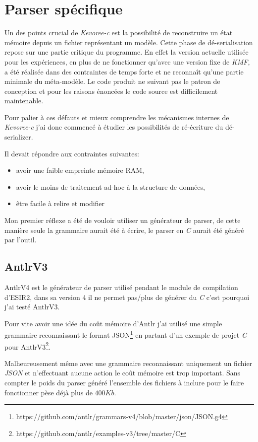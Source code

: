 \section{\label{parser-spécif}Parser spécifique}

Un des points crucial de \emph{Kevoree-c} est la possibilité de reconstruire un état mémoire depuis un fichier représentant un modèle. Cette phase de dé-serialisation repose sur une partie critique du programme. En effet la version actuelle utilisée pour les expériences, en plus de ne fonctionner qu'avec une version fixe de \emph{KMF}, a été réalisée dans des contraintes de temps forte et ne reconnaît qu'une partie minimale du méta-modèle.
Le code produit ne suivant pas le patron de conception et pour les raisons énoncées le code source est difficilement maintenable.

Pour palier à ces défauts et mieux comprendre les mécanismes internes de \emph{Kevoree-c} j'ai donc commencé à étudier les possibilités de ré-écriture du dé-serializer.

Il devait répondre aux contraintes suivantes:

\begin{itemize}
\item avoir une faible empreinte mémoire RAM,
\item avoir le moins de traitement ad-hoc à la structure de données,
\item être facile à relire et modifier
\end{itemize}

Mon premier réflexe a été de vouloir utiliser un générateur de parser, de cette manière seule la grammaire aurait été à écrire, le parser en \emph{C} aurait été généré par l'outil.

\subsection{AntlrV3}
AntlrV4 est le générateur de parser utilisé pendant le module de compilation d'ESIR2, dans sa version 4 il ne permet pas/plus de générer du \emph{C} c'est pourquoi j'ai testé AntlrV3.

Pour vite avoir une idée du coût mémoire d'Antlr j'ai utilisé une simple grammaire reconnaissant le format JSON\footnote{https://github.com/antlr/grammars-v4/blob/master/json/JSON.g4} en partant d'un exemple de projet \emph{C} pour AntlrV3\footnote{https://github.com/antlr/examples-v3/tree/master/C}.

Malheureusement même avec une grammaire reconnaissant uniquement un fichier \emph{JSON} et n'effectuant aucune action le coût mémoire est trop important. Sans compter le poids du parser généré l'ensemble des fichiers à inclure pour le faire fonctionner pèse déjà plus de $400Kb$.

